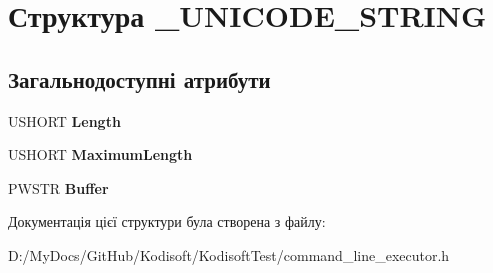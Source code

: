 \hypertarget{struct___u_n_i_c_o_d_e___s_t_r_i_n_g}{\section{Структура \+\_\+\+U\+N\+I\+C\+O\+D\+E\+\_\+\+S\+T\+R\+I\+N\+G}
\label{struct___u_n_i_c_o_d_e___s_t_r_i_n_g}
}
\subsection*{Загальнодоступні атрибути}
\begin{DoxyCompactItemize}
\item 
\hypertarget{struct___u_n_i_c_o_d_e___s_t_r_i_n_g_a3ebb6a85103954fd7fc325ba30c54008}{U\+S\+H\+O\+R\+T {\bfseries Length}}\label{struct___u_n_i_c_o_d_e___s_t_r_i_n_g_a3ebb6a85103954fd7fc325ba30c54008}

\item 
\hypertarget{struct___u_n_i_c_o_d_e___s_t_r_i_n_g_ae0487ecc173e55918bcee834bd3d107b}{U\+S\+H\+O\+R\+T {\bfseries Maximum\+Length}}\label{struct___u_n_i_c_o_d_e___s_t_r_i_n_g_ae0487ecc173e55918bcee834bd3d107b}

\item 
\hypertarget{struct___u_n_i_c_o_d_e___s_t_r_i_n_g_afbc2ba2b7be88d0118e683a2eb289795}{P\+W\+S\+T\+R {\bfseries Buffer}}\label{struct___u_n_i_c_o_d_e___s_t_r_i_n_g_afbc2ba2b7be88d0118e683a2eb289795}

\end{DoxyCompactItemize}


Документація цієї структури була створена з файлу\+:\begin{DoxyCompactItemize}
\item 
D\+:/\+My\+Docs/\+Git\+Hub/\+Kodisoft/\+Kodisoft\+Test/command\+\_\+line\+\_\+executor.\+h\end{DoxyCompactItemize}
